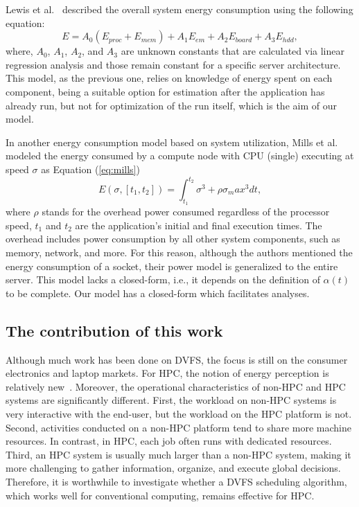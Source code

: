 Lewis et al.~\cite{Lewis2008Run-timeSystems} described the overall system energy consumption using the following equation:
\begin{equation}
	E = A_0(E_{proc} + E_{mem}) + A_1E_{em} + A_2E_{board} + A_3E_{hdd},
	\label{eq:lewvis}
\end{equation}
where, $A_0$, $A_1$, $A_2$, and $A_3$ are unknown constants that are calculated via linear regression analysis and those remain constant for a specific server architecture. This model, as the previous one, relies on knowledge of energy spent on each component, being  a suitable option for estimation after the application has already run, but not for optimization of the run itself, which is the aim of our model.

In another energy consumption model  based on system utilization, Mills et al. \cite{Mills2014EnergySystems} modeled the energy consumed by a compute node with CPU (single) executing at speed $\sigma$ as Equation (\ref{eq:mills})%
\begin{equation}
	E(\sigma,[t_1,t_2]) = \int_{t_1}^{t_2} \sigma^3 + \rho \sigma_max^3 dt,
	\label{eq:mills}
\end{equation}
where $\rho$ stands for the overhead power consumed regardless of the processor speed, $t_1$ and $t_2$ are the application's initial and final execution times. The overhead includes power consumption by all other system components, such as memory, network, and more. For this reason, although the authors mentioned the energy consumption of a socket, their power model is generalized to the entire server. This model lacks a closed-form, i.e., it depends on the definition of $\alpha(t)$ to be complete. Our model has a closed-form which facilitates analyses.


\subsection{The contribution of this work}

Although much work has been done on DVFS, the focus is still on the consumer electronics and laptop markets. 
For HPC, the notion of energy perception is relatively new~\cite{Feng2003MakingSupercomputing}. 
Moreover, the operational characteristics of non-HPC and HPC systems are significantly different. 
First, the workload on non-HPC systems is very interactive with the end-user, but the workload on the HPC platform is not.
Second, activities conducted on a non-HPC platform tend to share more machine resources.
In contrast, in HPC, each job often runs with dedicated resources. 
Third, an HPC system is usually much larger than a non-HPC system, making it more challenging to gather information, organize, and execute global decisions.
Therefore, it is worthwhile to investigate whether a DVFS scheduling algorithm, which works well for conventional computing, remains effective for HPC.

